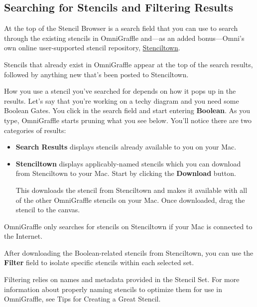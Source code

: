 \documentclass[../main.tex]{subfiles}
\begin{document}
\subsection{Searching for Stencils and Filtering Results}

At the top of the Stencil Browser is a search field that you can use to search through the
existing stencils in OmniGraffle and---as an added bonus---Omni's own online user-supported
stencil repository, \href{http://stenciltown.omnigroup.com}{Stenciltown}.


Stencils that already exist in OmniGraffle appear at the top of the search results, followed by
anything new that's been posted to Stenciltown.

How you use a stencil you've searched for depends on how it pops up in the results. Let's say
that you're working on a techy diagram and you need some Boolean Gates. You click in the
search field and start entering \textbf{Boolean}. As you type, OmniGraffle starts pruning what
you see below. You'll notice there are two categories of results:

\begin{itemize}
  \item \textbf{Search Results} displays stencils already available to you on your Mac.
  \item \textbf{Stenciltown} displays applicably-named stencils which you can download from
    Stenciltown to your Mac. Start by clicking the \textbf{Download} button.


    This downloads the stencil from Stenciltown and makes it available with all of the other
    OmniGraffle stencils on your Mac. Once downloaded, drag the stencil to the canvas.
\end{itemize}

\begin{ognote}
  OmniGraffle only searches for stencils on Stenciltown if your Mac is connected to the Internet.
\end{ognote}

After downloading the Boolean-related stencils from Stenciltown, you can use the \textbf{Filter}
field to isolate specific stencils within each selected set.


\begin{ognote}
  Filtering relies on names and metadata provided in the Stencil Set. For more information about
  properly naming stencils to optimize them for use in OmniGraffle, see Tips for Creating a
  Great Stencil.
\end{ognote}
\end{document}

